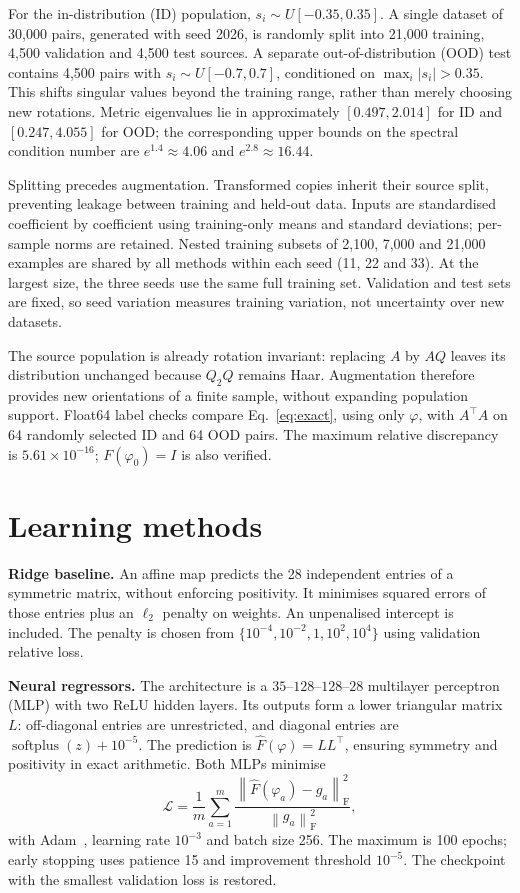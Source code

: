 \documentclass[a4paper,11pt]{article}
\newcommand{\Fhat}{\widehat F}
\newcommand{\normF}[1]{\left\lVert#1\right\rVert_{\mathrm F}}
\begin{document}
For the in-distribution (ID) population, $s_i\sim U[-0.35,0.35]$. A single dataset
of 30,000 pairs, generated with seed 2026, is randomly split into 21,000 training,
4,500 validation and 4,500 test sources. A separate out-of-distribution (OOD) test
contains 4,500 pairs with $s_i\sim U[-0.7,0.7]$, conditioned on
$\max_i|s_i|>0.35$. This shifts singular values beyond the training range, rather
than merely choosing new rotations. Metric eigenvalues lie in approximately
$[0.497,2.014]$ for ID and $[0.247,4.055]$ for OOD; the corresponding upper bounds
on the spectral condition number are $e^{1.4}\approx4.06$ and $e^{2.8}\approx16.44$.

Splitting precedes augmentation. Transformed copies inherit their source split,
preventing leakage between training and held-out data. Inputs are standardised
coefficient by coefficient using training-only means and standard deviations;
per-sample norms are retained. Nested training subsets of 2,100, 7,000 and 21,000
examples are shared by all methods within each seed (11, 22 and 33). At the largest
size, the three seeds use the same full training set. Validation and test sets are
fixed, so seed variation measures training variation, not uncertainty over new datasets.

The source population is already rotation invariant: replacing $A$ by $AQ$ leaves
its distribution unchanged because $Q_2Q$ remains Haar. Augmentation therefore
provides new orientations of a finite sample, without expanding population support.
Float64 label checks compare Eq.~\eqref{eq:exact}, using only $\varphi$, with
$A^\top A$ on 64 randomly selected ID and 64 OOD pairs. The maximum relative
discrepancy is $5.61\times10^{-16}$; $F(\varphi_0)=I$ is also verified.

\section{Learning methods}
\textbf{Ridge baseline.}
An affine map predicts the 28 independent entries of a symmetric matrix, without
enforcing positivity. It minimises squared errors of those entries plus an
$\ell_2$ penalty on weights. An unpenalised intercept is included. The penalty is
chosen from $\{10^{-4},10^{-2},1,10^2,10^4\}$ using validation relative loss.

\textbf{Neural regressors.}
The architecture is a $35$--$128$--$128$--$28$ multilayer perceptron (MLP) with two
ReLU hidden layers. Its outputs form a lower triangular matrix $L$: off-diagonal
entries are unrestricted, and diagonal entries are
$\operatorname{softplus}(z)+10^{-5}$. The prediction is $\Fhat(\varphi)=LL^\top$,
ensuring symmetry and positivity in exact arithmetic. Both MLPs minimise
\begin{equation}\label{eq:loss}
\mathcal L=\frac1m\sum_{a=1}^{m}
\frac{\normF{\Fhat(\varphi_a)-g_a}^{2}}{\normF{g_a}^{2}},
\end{equation}
with Adam~\cite{adam}, learning rate $10^{-3}$ and batch size 256. The maximum is
100 epochs; early stopping uses patience 15 and improvement threshold $10^{-5}$.
The checkpoint with the smallest validation loss is restored.
\end{document}
